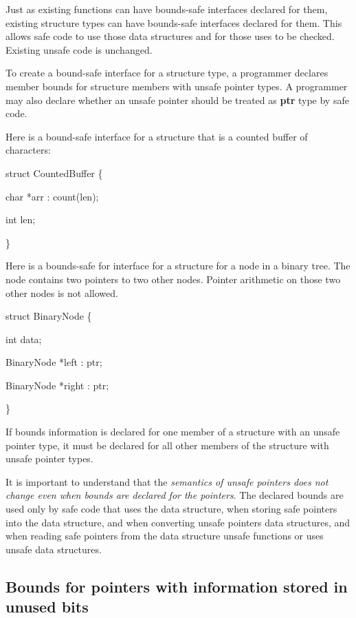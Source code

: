 \documentclass[]{article}
\begin{document}
Just as existing functions can have bounds-safe interfaces declared for
them, existing structure types can have bounds-safe interfaces declared
for them. This allows safe code to use those data structures and for
those uses to be checked. Existing unsafe code is unchanged.

To create a bound-safe interface for a structure type, a programmer
declares member bounds for structure members with unsafe pointer types.
A programmer may also declare whether an unsafe pointer should be
treated as \textbf{ptr} type by safe code.

Here is a bound-safe interface for a structure that is a counted buffer
of characters:

struct CountedBuffer \{

char *arr : count(len);

int len;

\}

Here is a bounds-safe for interface for a structure for a node in a
binary tree. The node contains two pointers to two other nodes. Pointer
arithmetic on those two other nodes is not allowed.

struct BinaryNode \{

int data;

BinaryNode *left : ptr;

BinaryNode *right : ptr;

\}

If bounds information is declared for one member of a structure with an
unsafe pointer type, it must be declared for all other members of the
structure with unsafe pointer types.

It is important to understand that the \emph{semantics of unsafe
pointers does not change even when bounds are declared for the
pointers}. The declared bounds are used only by safe code that uses the
data structure, when storing safe pointers into the data structure, and
when converting unsafe pointers data structures, and when reading safe
pointers from the data structure unsafe functions or uses unsafe data
structures.

\subsection{\texorpdfstring{\protect\hypertarget{ux5fRef435190711}{}{\protect\hypertarget{ux5fToc435434983}{}{\protect\hypertarget{ux5fToc437460816}{}{\protect\hypertarget{ux5fToc440445497}{}{\protect\hypertarget{ux5fToc440449279}{}{\protect\hypertarget{ux5fToc440551929}{}{}}}}}}Bounds
for pointers with information stored in unused
bits}{Bounds for pointers with information stored in unused bits}}\label{bounds-for-pointers-with-information-stored-in-unused-bits}
\end{document}
